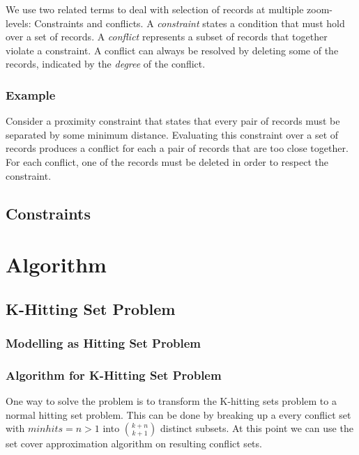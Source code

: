 We use two related terms to deal with selection of records at multiple zoom-levels: Constraints and conflicts. A \emph{constraint} states a condition that must hold over a set of records. A \emph{conflict} represents a subset of records that together violate a constraint. A conflict can always be resolved by deleting some of the records, indicated by the \emph{degree} of the conflict.

\subsubsection{Example}
Consider a proximity constraint that states that every pair of records must be separated by some minimum distance. Evaluating this constraint over a set of records produces a conflict for each a pair of records that are too close together. For each conflict, one of the records must be deleted in order to respect the constraint.

\subsection{Constraints}






\section{Algorithm}

\subsection{K-Hitting Set Problem}

\subsubsection{Modelling as Hitting Set Problem}


\subsubsection{Algorithm for K-Hitting Set Problem}

One way to solve the problem is to transform the K-hitting sets problem to a normal hitting set problem. This can be done by breaking up a every conflict set with $minhits=n>1$ into $k+n \choose k+1$ distinct subsets. At this point we can use the set cover approximation algorithm on resulting conflict sets.

